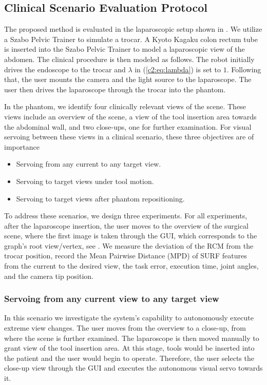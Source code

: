 
\subsection{Clinical Scenario Evaluation Protocol}
\label{c2:sec:clin_protocol}

The proposed method is evaluated in the laparoscopic setup shown in . We utilize a Szabo Pelvic Trainer to simulate a trocar. A Kyoto Kagaku colon rectum tube is inserted into the Szabo Pelvic Trainer to model a laparoscopic view of the abdomen. The clinical procedure is then modeled as follows. The robot initially drives the endoscope to the trocar and $\lambda$ in (\eqref{c2:eq:lambda}) is set to $1$. Following that, the user mounts the camera and the light source to the laparoscope. The user then drives the laparoscope through the trocar into the phantom.

In the phantom, we identify four clinically relevant views of the scene. These views include an overview of the scene, a view of the tool insertion area towards the abdominal wall, and two close-ups, one for further examination. For visual servoing between these views in a clinical scenario, these three objectives are of importance

\begin{itemize}
    \item Servoing from any current to any target view.
    \item Servoing to target views under tool motion.
    \item Servoing to target views after phantom repositioning.
\end{itemize}

To address these scenarios, we design three experiments. For all experiments, after the laparoscope insertion, the user moves to the overview of the surgical scene, where the first image is taken through the GUI, which corresponds to the graph's root view/vertex, see . We measure the deviation of the RCM from the trocar position, record the Mean Pairwise Distance (MPD) of SURF features from the current to the desired view, the task error, execution time, joint angles, and the camera tip position.

\subsubsection{Servoing from any current view to any target view}
\label{c2:sec:clin_protocol_any}
In this scenario we investigate the system's capability to autonomously execute extreme view changes. The user moves from the overview to a close-up, from where the scene is further examined. The laparoscope is then moved manually to grant view of the tool insertion area. At this stage, tools would be inserted into the patient and the user would begin to operate. Therefore, the user selects the close-up view through the GUI and executes the autonomous visual servo towards it.

